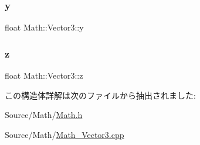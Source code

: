 \subsubsection{\texorpdfstring{y}{y}}
{\footnotesize\ttfamily float Math\+::\+Vector3\+::y}

\mbox{\label{struct_math_1_1_vector3_a425203878d04e4e15de18527a4d3cd0f}} 
\subsubsection{\texorpdfstring{z}{z}}
{\footnotesize\ttfamily float Math\+::\+Vector3\+::z}



この構造体詳解は次のファイルから抽出されました\+:\begin{DoxyCompactItemize}
\item 
Source/\+Math/\mbox{\hyperlink{_math_8h}{Math.\+h}}\item 
Source/\+Math/\mbox{\hyperlink{_math___vector3_8cpp}{Math\+\_\+\+Vector3.\+cpp}}\end{DoxyCompactItemize}
